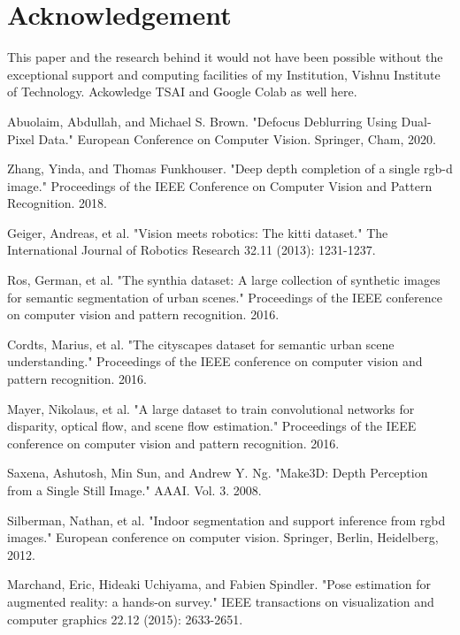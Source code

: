 \documentclass{article}
\begin{document}
\section{Acknowledgement}
This paper and the research behind it would not have been possible without the exceptional support and computing 
facilities of my Institution, Vishnu Institute of Technology. Ackowledge TSAI and Google Colab as well here.


\begin{thebibliography}{10}
 Abuolaim, Abdullah, and Michael S. Brown. "Defocus Deblurring Using Dual-Pixel Data." European Conference on Computer Vision. Springer, Cham, 2020.

 Zhang, Yinda, and Thomas Funkhouser. "Deep depth completion of a single rgb-d image." Proceedings of the IEEE Conference on Computer Vision and Pattern Recognition. 2018.

 Geiger, Andreas, et al. "Vision meets robotics: The kitti dataset." The International Journal of Robotics Research 32.11 (2013): 1231-1237.

 Ros, German, et al. "The synthia dataset: A large collection of synthetic images for semantic segmentation of urban scenes." Proceedings of the IEEE conference on computer vision and pattern recognition. 2016.

 Cordts, Marius, et al. "The cityscapes dataset for semantic urban scene understanding." Proceedings of the IEEE conference on computer vision and pattern recognition. 2016.

 Mayer, Nikolaus, et al. "A large dataset to train convolutional networks for disparity, optical flow, and scene flow estimation." Proceedings of the IEEE conference on computer vision and pattern recognition. 2016.

 Saxena, Ashutosh, Min Sun, and Andrew Y. Ng. "Make3D: Depth Perception from a Single Still Image." AAAI. Vol. 3. 2008.

 Silberman, Nathan, et al. "Indoor segmentation and support inference from rgbd images." European conference on computer vision. Springer, Berlin, Heidelberg, 2012.

 Marchand, Eric, Hideaki Uchiyama, and Fabien Spindler. "Pose estimation for augmented reality: a hands-on survey." IEEE transactions on visualization and computer graphics 22.12 (2015): 2633-2651.


\end{thebibliography}
\end{document}
